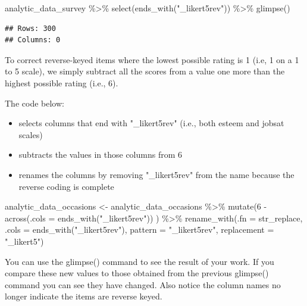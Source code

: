 \documentclass[
]{krantz}
\makeatletter
\newenvironment{Shaded}{\begin{snugshade}}{\end{snugshade}}
\newcommand{\AttributeTok}[1]{\textcolor[rgb]{0.61,0.61,0.61}{#1}}
\newcommand{\DecValTok}[1]{\textcolor[rgb]{0.06,0.06,0.06}{#1}}
\newcommand{\FunctionTok}[1]{\textcolor[rgb]{0,0,0}{#1}}
\newcommand{\NormalTok}[1]{#1}
\newcommand{\OtherTok}[1]{\textcolor[rgb]{0.37,0.37,0.37}{#1}}
\newcommand{\SpecialCharTok}[1]{\textcolor[rgb]{0,0,0}{#1}}
\newcommand{\StringTok}[1]{\textcolor[rgb]{0.5,0.5,0.5}{#1}}
\providecommand{\tightlist}{%
  \setlength{\itemsep}{0pt}\setlength{\parskip}{0pt}}
\newenvironment{kframe}{%
\medskip{}
\setlength{\fboxsep}{.8em}
 \def\at@end@of@kframe{}%
 \ifinner\ifhmode%
  \def\at@end@of@kframe{\end{minipage}}%
  \begin{minipage}{\columnwidth}%
 \fi\fi%
 \def\FrameCommand##1{\hskip\@totalleftmargin \hskip-\fboxsep
 \colorbox{shadecolor}{##1}\hskip-\fboxsep
     \hskip-\linewidth \hskip-\@totalleftmargin \hskip\columnwidth}%
 \MakeFramed {\advance\hsize-\width
   \@totalleftmargin\z@ \linewidth\hsize
   \@setminipage}}%
 {\par\unskip\endMakeFramed%
 \at@end@of@kframe}
\renewenvironment{Shaded}{\begin{kframe}}{\end{kframe}}
\makeatother
\begin{document}
\begin{Shaded}
\begin{Highlighting}[]
\NormalTok{analytic\_data\_survey }\SpecialCharTok{\%\textgreater{}\%}
  \FunctionTok{select}\NormalTok{(}\FunctionTok{ends\_with}\NormalTok{(}\StringTok{"\_likert5rev"}\NormalTok{)) }\SpecialCharTok{\%\textgreater{}\%}
  \FunctionTok{glimpse}\NormalTok{()}
\end{Highlighting}
\end{Shaded}

\begin{verbatim}
## Rows: 300
## Columns: 0
\end{verbatim}

To correct reverse-keyed items where the lowest possible rating is 1 (i.e, 1 on a 1 to 5 scale), we simply subtract all the scores from a value one more than the highest possible rating (i.e., 6).

The code below:

\begin{itemize}
\tightlist
\item
  selects columns that end with "\_likert5rev" (i.e., both esteem and jobsat scales)
\item
  subtracts the values in those columns from 6
\item
  renames the columns by removing "\_likert5rev" from the name because the reverse coding is complete
\end{itemize}

\begin{Shaded}
\begin{Highlighting}[]
\NormalTok{analytic\_data\_occasions }\OtherTok{\textless{}{-}}\NormalTok{ analytic\_data\_occasions }\SpecialCharTok{\%\textgreater{}\%} 
  \FunctionTok{mutate}\NormalTok{(}\DecValTok{6} \SpecialCharTok{{-}} \FunctionTok{across}\NormalTok{(}\AttributeTok{.cols =} \FunctionTok{ends\_with}\NormalTok{(}\StringTok{"\_likert5rev"}\NormalTok{)) ) }\SpecialCharTok{\%\textgreater{}\%} 
  \FunctionTok{rename\_with}\NormalTok{(}\AttributeTok{.fn =}\NormalTok{ str\_replace,}
              \AttributeTok{.cols =} \FunctionTok{ends\_with}\NormalTok{(}\StringTok{"\_likert5rev"}\NormalTok{),}
              \AttributeTok{pattern =} \StringTok{"\_likert5rev"}\NormalTok{,}
              \AttributeTok{replacement =} \StringTok{"\_likert5"}\NormalTok{)}
\end{Highlighting}
\end{Shaded}

You can use the glimpse() command to see the result of your work. If you compare these new values to those obtained from the previous glimpse() command you can see they have changed. Also notice the column names no longer indicate the items are reverse keyed.
\end{document}
